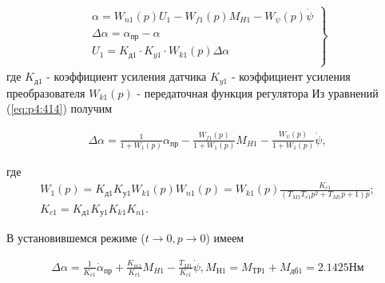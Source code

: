 \begin{equation}%
\label{eq:p4:414}
\begin{alignedat}{2}
\left. \begin{array}{ll}
\alpha =W_{n1} \left( p \right) U_{1}-W_{f1} \left( p \right) M_{H1}-W_{ \psi } \left( p \right) \dot \psi\\
\Delta  \alpha = \alpha _{\textit{пр}}- \alpha\\
U_{1}=K_{\textit{д1}}\cdot K_{y1} \cdot W_{k1} \left( p \right)  \Delta  \alpha \\
\end{array}  \right\rbrace  
\end{alignedat}
\end{equation}
где
$K_{\textit{д1}}$ - коэффициент усиления датчика
$K_{\textit{y1}}$ - коэффициент усиления преобразователя
$W_{k1} \left( p \right)$ - передаточная функция регулятора
Из уравнений (\ref{eq:p4:414}) получим

\begin{equation}%
\label{eq:p4:415}
\begin{alignedat}{2}
\Delta  \alpha =\frac{1}{1+W_{1} \left( p \right) } \alpha _{\textit{пр}}-\frac{W_{f1} \left( p \right) }{1+W_{1} \left( p \right) }M_{H1}-\frac{W_{ \psi } \left( p \right) }{1+W_{1} \left( p \right) } \dot \psi,
\end{alignedat}
\end{equation}

где 
\begin{equation}
\label{eq:p4:415+}
\begin{alignedat}{2}
 W_{1} \left( p \right) =
 K_{\textit{д1}}K_{\textit{у1}}W_{k1} \left( p \right) W_{n1} \left( p \right) =
 W_{k1} \left( p \right) \frac{K_{c1}}{ \left( T_{M1}T_{e1}p^{2}+T_{M1}p+1 \right) p}; \\
  K_{c1}=K_{\textit{д1}}K_{\textit{у1}}K_{k1}K_{n1}.
\end{alignedat}
\end{equation}

В установившемся режиме ($t\rightarrow0, p\rightarrow0$) имеем\par

\begin{equation}
\label{eq:p4:415+2}
\begin{alignedat}{2}
\Delta  \alpha =
\frac{1}{K_{c1}} \dot \alpha_{\textit{пр}} + \frac{K_{m1}}{K_{c1}}M_{H1} - \frac{T_{M1}}{K_{c1}} \dot \psi ,
M_{Н1}=M_{\textit{ТР1}}+M_{\textit{дб1}}=2.1425\textit{Нм}
\end{alignedat}
\end{equation}


